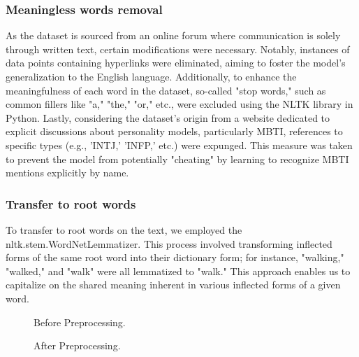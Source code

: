 \documentclass{article}
\begin{document}
\subsubsection{Meaningless words removal}
As the dataset is sourced from an online forum where communication is solely through written text, certain modifications were necessary. Notably, instances of data points containing hyperlinks were eliminated, aiming to foster the model's generalization to the English language. Additionally, to enhance the meaningfulness of each word in the dataset, so-called "stop words," such as common fillers like "a," "the," "or," etc., were excluded using the NLTK library in Python. Lastly, considering the dataset's origin from a website dedicated to explicit discussions about personality models, particularly MBTI, references to specific types (e.g., 'INTJ,' 'INFP,' etc.) were expunged. This measure was taken to prevent the model from potentially "cheating" by learning to recognize MBTI mentions explicitly by name.
\subsubsection{Transfer to root words}
To transfer to root words on the text, 
we employed the nltk.stem.WordNetLemmatizer. 
This process involved transforming inflected forms of the same root word into their dictionary form; for instance, "walking," "walked," and "walk" were all lemmatized to "walk." This approach enables us to capitalize on the shared meaning inherent in various inflected forms of a given word.
\begin{figure}
  \centering
  \caption{ Before Preprocessing.}
\end{figure}
\begin{figure}
  \centering
  \caption{ After Preprocessing.}
\end{figure}
\end{document}
